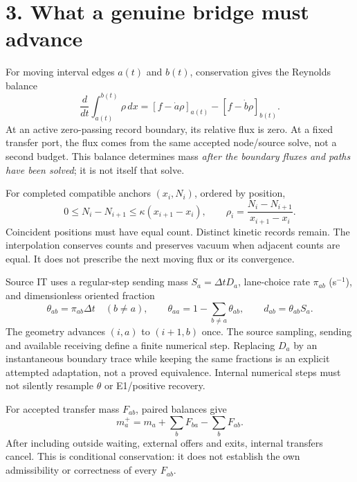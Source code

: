 \documentclass[11pt,a4paper]{article}
\begin{document}
\newpage
\section*{3. What a genuine bridge must advance}
For moving interval edges $a(t)$ and $b(t)$, conservation gives the Reynolds
balance
\begin{equation}
 \frac{d}{dt}\int_{a(t)}^{b(t)}\rho\,dx
 = [f-\dot a\rho]_{a(t)}-[f-\dot b\rho]_{b(t)}.
\end{equation}
At an active zero-passing record boundary, its relative flux is zero. At a
fixed transfer port, the flux comes from the same accepted node/source solve,
not a second budget. This balance determines mass \emph{after the boundary
fluxes and paths have been solved}; it is not itself that solve.

For completed compatible anchors $(x_i,N_i)$, ordered by position,
\begin{equation}
 0\le N_i-N_{i+1}\le\kappa(x_{i+1}-x_i),\qquad
 \rho_i=\frac{N_i-N_{i+1}}{x_{i+1}-x_i}.
\end{equation}
Coincident positions must have equal count. Distinct kinetic records remain.
The interpolation conserves counts and preserves vacuum when adjacent counts
are equal. It does not prescribe the next moving flux or its convergence.

Source IT uses a regular-step sending mass $S_a=\Delta t D_a$, lane-choice
rate $\pi_{ab}$ (s$^{-1}$), and dimensionless oriented fraction
\begin{equation}
 \theta_{ab}=\pi_{ab}\Delta t\quad(b\ne a),\qquad
 \theta_{aa}=1-\sum_{b\ne a}\theta_{ab},\qquad
 d_{ab}=\theta_{ab}S_a.
\end{equation}
The geometry advances $(i,a)$ to $(i+1,b)$ once. The source sampling, sending
and available receiving define a finite numerical step. Replacing $D_a$ by
an instantaneous boundary trace while keeping the same fractions is an
explicit attempted adaptation, not a proved equivalence. Internal numerical
steps must not silently resample $\theta$ or E1/positive recovery.

For accepted transfer mass $F_{ab}$, paired balances give
\begin{equation}
 m_a^+=m_a+\sum_bF_{ba}-\sum_bF_{ab}.
\end{equation}
After including outside waiting, external offers and exits, internal transfers
cancel. This is conditional conservation: it does not establish the own
admissibility or correctness of every $F_{ab}$.
\end{document}
